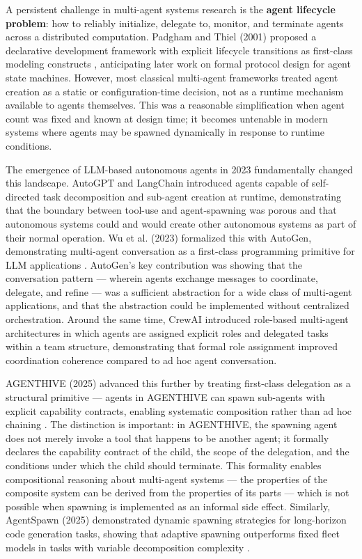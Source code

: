 A persistent challenge in multi-agent systems research is the \textbf{agent lifecycle problem}: how to reliably initialize, delegate to, monitor, and terminate agents across a distributed computation. Padgham and Thiel (2001) proposed a declarative development framework with explicit lifecycle transitions as first-class modeling constructs \cite{padgham2001}, anticipating later work on formal protocol design for agent state machines. However, most classical multi-agent frameworks treated agent creation as a static or configuration-time decision, not as a runtime mechanism available to agents themselves. This was a reasonable simplification when agent count was fixed and known at design time; it becomes untenable in modern systems where agents may be spawned dynamically in response to runtime conditions.

The emergence of LLM-based autonomous agents in 2023 fundamentally changed this landscape. AutoGPT \cite{autoGPT2023} and LangChain \cite{langchain2023} introduced agents capable of self-directed task decomposition and sub-agent creation at runtime, demonstrating that the boundary between tool-use and agent-spawning was porous and that autonomous systems could and would create other autonomous systems as part of their normal operation. Wu et al. (2023) formalized this with AutoGen, demonstrating multi-agent conversation as a first-class programming primitive for LLM applications \cite{autogen2023}. AutoGen's key contribution was showing that the conversation pattern — wherein agents exchange messages to coordinate, delegate, and refine — was a sufficient abstraction for a wide class of multi-agent applications, and that the abstraction could be implemented without centralized orchestration. Around the same time, CrewAI \cite{crewai2024} introduced role-based multi-agent architectures in which agents are assigned explicit roles and delegated tasks within a team structure, demonstrating that formal role assignment improved coordination coherence compared to ad hoc agent conversation.

AGENTHIVE (2025) advanced this further by treating first-class delegation as a structural primitive — agents in AGENTHIVE can spawn sub-agents with explicit capability contracts, enabling systematic composition rather than ad hoc chaining \cite{agenthive2025}. The distinction is important: in AGENTHIVE, the spawning agent does not merely invoke a tool that happens to be another agent; it formally declares the capability contract of the child, the scope of the delegation, and the conditions under which the child should terminate. This formality enables compositional reasoning about multi-agent systems — the properties of the composite system can be derived from the properties of its parts — which is not possible when spawning is implemented as an informal side effect. Similarly, AgentSpawn (2025) demonstrated dynamic spawning strategies for long-horizon code generation tasks, showing that adaptive spawning outperforms fixed fleet models in tasks with variable decomposition complexity \cite{agentspawn2025}.

